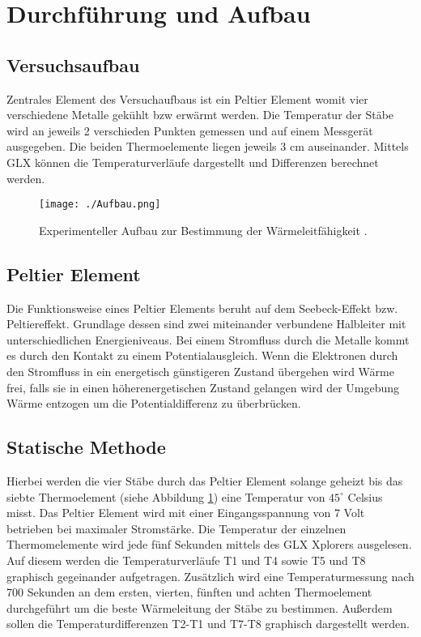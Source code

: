 \section{Durchführung und Aufbau}
\label{sec:Durchführung}
\subsection{Versuchsaufbau}
Zentrales Element des Versuchaufbaus ist ein Peltier Element womit vier verschiedene Metalle gekühlt bzw erwärmt werden. Die Temperatur der Stäbe wird an jeweils 2 verschieden Punkten gemessen und auf einem Messgerät ausgegeben. Die beiden Thermoelemente liegen jeweils 3 \si{\cm} auseinander. Mittels GLX können die Temperaturverläufe dargestellt und Differenzen berechnet werden.

\begin{figure}[ht]
	\centering
	\texttt{[image: ./Aufbau.png]}
	\caption{Experimenteller Aufbau zur Bestimmung der Wärmeleitfähigkeit \cite{Aufbau}.}
	\label{fig:Aufbau}
\end{figure}



\subsection{Peltier Element}
Die Funktionsweise eines Peltier Elements beruht auf dem Seebeck-Effekt bzw. Peltiereffekt. Grundlage dessen sind zwei miteinander verbundene Halbleiter mit unterschiedlichen Energieniveaus. Bei einem Stromfluss durch die Metalle kommt es durch den Kontakt zu einem Potentialausgleich. Wenn die Elektronen durch den Stromfluss in ein energetisch günstigeren Zustand übergehen wird Wärme frei, falls sie in einen höherenergetischen Zustand gelangen wird der Umgebung Wärme entzogen um die Potentialdifferenz zu überbrücken.


\subsection{Statische Methode}
Hierbei werden die vier Stäbe durch das Peltier Element solange geheizt bis das siebte Thermoelement (siehe Abbildung \ref{fig:Aufbau}) eine Temperatur von $45^\circ$ Celsius misst. Das Peltier Element wird mit einer Eingangsspannung von 7 Volt betrieben bei maximaler Stromstärke. Die Temperatur der einzelnen Thermomelemente wird jede fünf Sekunden mittels des GLX Xplorers ausgelesen. Auf diesem werden die Temperaturverläufe T1 und T4 sowie T5 und T8 graphisch gegeinander aufgetragen. Zusätzlich wird eine Temperaturmessung nach 700 Sekunden an dem ersten, vierten, fünften und achten Thermoelement durchgeführt um die beste Wärmeleitung der Stäbe zu bestimmen. Außerdem sollen die Temperaturdifferenzen T2-T1 und T7-T8 graphisch dargestellt werden.

